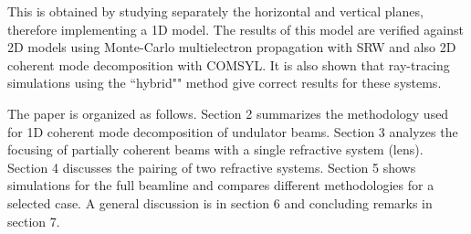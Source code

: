 \documentclass{iucr}              %
\newcommand{\todo}[1]{{\color{red}[TODO: "#1'']}}
\begin{document}





This is obtained by studying separately the horizontal and vertical planes, therefore implementing a 1D model. The results of this model are verified against 2D models using Monte-Carlo multielectron propagation with SRW and also 2D coherent mode decomposition with COMSYL. It is also shown that ray-tracing simulations using the ``hybrid"" method \cite{codeHYBRID} give correct results for these systems. 

The paper is organized as follows. Section 2 summarizes the methodology used for 1D coherent mode decomposition of undulator beams. Section 3 analyzes the focusing of partially coherent beams with a single refractive system (lens). Section 4 discusses the pairing of two refractive systems. Section 5 shows simulations for the full beamline and compares different methodologies for a selected case. A general discussion is in section 6 and concluding remarks in section 7. 


\end{document}
